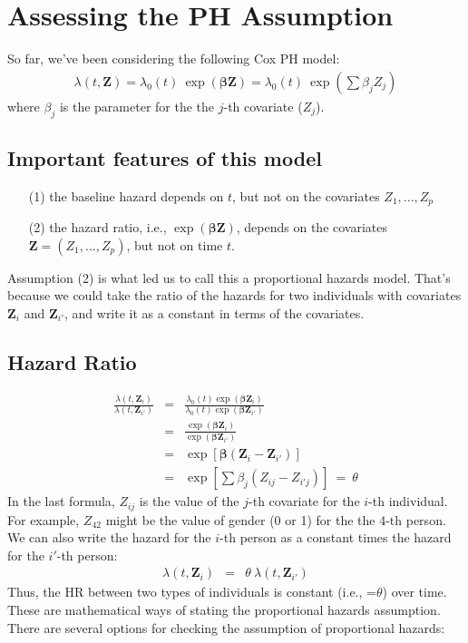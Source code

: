 \documentclass[11pt,psfig]{book}
\begin{document}
\setcounter{page}{127}\setcounter{chapter}{7}
\chapter{Assessing the PH Assumption}

So far, we've been considering the following Cox PH model:
\begin{eqnarray*}
\lambda(t,\mathbf{Z}) = \lambda_0(t) ~ \exp(\mathbf{\beta} \mathbf{Z})
                  = \lambda_0(t) ~\exp\left(\sum \beta_j Z_j\right)
\end{eqnarray*}
where $\beta_j$ is the parameter for the the $j$-th covariate ($Z_j$).

\section{Important features of this model}
\begin{itemize}
\item[(1)] the baseline hazard depends on $t$, but not on the covariates
$Z_1,...,Z_p$
\item[(2)] the hazard ratio, i.e., $\exp(\mathbf{\beta} \mathbf{Z})$, depends on
the covariates $\mathbf{Z}=(Z_1,...,Z_p)$, but not on time $t$.
\end{itemize}
Assumption (2) is what led us to call this a proportional
hazards model.  That's because we could take the ratio of the
hazards for two individuals with covariates $\mathbf{Z}_{i}$ and
$\mathbf{Z}_{i'}$, and write it as a constant in terms of the covariates.
\section{Hazard Ratio}
\begin{eqnarray*}
\frac{\lambda(t,{\mathbf{Z}_i})}{\lambda(t,{\mathbf{Z}_{i'}})} & = &
\frac{\lambda_0(t) \exp(\mathbf{\beta} \mathbf{Z}_i)}
{\lambda_0(t) \exp(\mathbf{\beta} \mathbf{Z}_{i'})}\\[2ex]
& = & \frac{\exp(\mathbf{\beta} \mathbf{Z}_i)}
{\exp(\mathbf{\beta} \mathbf{Z}_{i'})}\\[2ex]
& = & \exp[\mathbf{\beta} (\mathbf{Z}_i - \mathbf{Z}_{i'})]\\[2ex]
& = & \exp[\sum \beta_j (Z_{ij} - Z_{i'j})] ~=~ \theta
\end{eqnarray*}
In the last formula, $Z_{ij}$ is the value of the $j$-th covariate
for the $i$-th individual.  For example, $Z_{42}$ might be the value
of {\sc gender} (0 or 1) for the the 4-th person.
\\[2ex]
We can also write the hazard for the $i$-th person as a constant
times the hazard for the $i'$-th person:
\begin{eqnarray*}
\lambda(t,{\mathbf{Z}_i}) & = & \theta ~ \lambda(t,{\mathbf{Z}_{i'}})
\end{eqnarray*}
Thus, the HR between two types of individuals is constant (i.e., =$\theta$)
over time.  These are mathematical ways of stating the proportional
hazards assumption.
\\[2ex]
There are several options for checking the assumption of
proportional hazards:
\end{document}
